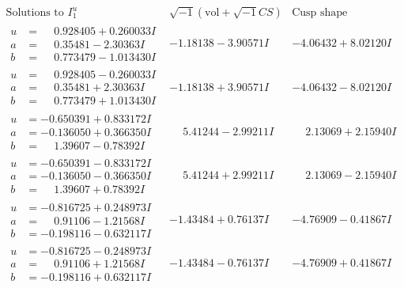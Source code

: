\documentclass[1p]{elsarticle_modified}
\theoremstyle{definition}
\newcommand{\I}{\sqrt{-1}}
\begin{document}
$$\begin{array}{c|c|c}  
\text{Solutions to }I^u_{1}& \I (\text{vol} + \sqrt{-1}CS) & \text{Cusp shape}\\
 \hline 
\begin{aligned}
u &= \phantom{-}0.928405 + 0.260033 I \\
a &= \phantom{-}0.35481 - 2.30363 I \\
b &= \phantom{-}0.773479 - 1.013430 I\end{aligned}
 & -1.18138 - 3.90571 I & -4.06432 + 8.02120 I \\ \hline\begin{aligned}
u &= \phantom{-}0.928405 - 0.260033 I \\
a &= \phantom{-}0.35481 + 2.30363 I \\
b &= \phantom{-}0.773479 + 1.013430 I\end{aligned}
 & -1.18138 + 3.90571 I & -4.06432 - 8.02120 I \\ \hline\begin{aligned}
u &= -0.650391 + 0.833172 I \\
a &= -0.136050 + 0.366350 I \\
b &= \phantom{-}1.39607 - 0.78392 I\end{aligned}
 & \phantom{-}5.41244 - 2.99211 I & \phantom{-}2.13069 + 2.15940 I \\ \hline\begin{aligned}
u &= -0.650391 - 0.833172 I \\
a &= -0.136050 - 0.366350 I \\
b &= \phantom{-}1.39607 + 0.78392 I\end{aligned}
 & \phantom{-}5.41244 + 2.99211 I & \phantom{-}2.13069 - 2.15940 I \\ \hline\begin{aligned}
u &= -0.816725 + 0.248973 I \\
a &= \phantom{-}0.91106 - 1.21568 I \\
b &= -0.198116 - 0.632117 I\end{aligned}
 & -1.43484 + 0.76137 I & -4.76909 - 0.41867 I \\ \hline\begin{aligned}
u &= -0.816725 - 0.248973 I \\
a &= \phantom{-}0.91106 + 1.21568 I \\
b &= -0.198116 + 0.632117 I\end{aligned}
 & -1.43484 - 0.76137 I & -4.76909 + 0.41867 I \\ \hline\begin{aligned}

\end{aligned}
\end{array}$$
\end{document}
